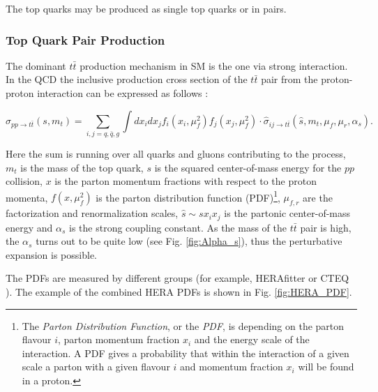 The top quarks may be produced as single top quarks or in pairs.

\subsubsection{Top Quark Pair Production}

The dominant $t\bar{t}$ production mechanism in SM is the one via strong interaction. In the QCD the inclusive production cross section of the $t\bar{t}$ pair
from the proton-proton interaction can be expressed as follows \cite{Schilling:2012dx}:

\begin{equation}
 \sigma_{pp \rightarrow t\bar{t}} (s, m_{t}) = \sum_{i,j = q, \bar{q}, g} \int dx_{i} dx_{j} f_{i}(x_{i}, \mu_{f}^{2}) f_{j}(x_{j}, \mu_{f}^{2}) \cdot \hat{\sigma}_{ij \rightarrow t\bar{t}}(\hat{s}, m_{t}, \mu_{f}, \mu_{r}, \alpha_{s}).
\end{equation}

Here the sum is running over all quarks and gluons contributing to the process, $m_{t}$ is the mass of the top quark, $s$ is the squared center-of-mass 
energy for the $pp$ collision, $x$ is the parton momentum fractions with respect to the proton momenta, $f(x, \mu_{f}^{2})$ is the parton distribution
function (PDF)\footnote{The \textit{Parton Distribution Function}, or the \textit{PDF}, is depending on the parton flavour $i$, parton momentum
fraction $x_{i}$ and the energy scale of the interaction. A PDF gives a probability that within the interaction of a given scale a parton with a given flavour $i$
and momentum fraction $x_{i}$ will be found in a proton.}, $\mu_{f,r}$ are the factorization and renormalization scales, $\hat{s} \sim sx_{i}x_{j}$ is the 
partonic center-of-mass energy and $\alpha_{s}$ is the strong coupling constant. As the mass of the $t\bar{t}$ pair is high, the $\alpha_{s}$ turns out
to be quite low (see Fig. \ref{fig:Alpha_s}), thus the perturbative expansion is possible.

The PDFs are measured by different groups (for example, HERAfitter \cite{Alekhin:2014irh} or CTEQ \cite{Pumplin:2002vw}). The example of the combined HERA 
PDFs is shown in Fig. \ref{fig:HERA_PDF}.


